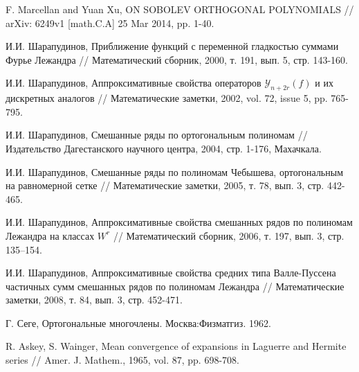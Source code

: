 \begin{thebibliography}{1}
 F. Marcellan and Yuan Xu, ON SOBOLEV ORTHOGONAL POLYNOMIALS //  arXiv: 6249v1 [math.C.A] 25 Mar 2014, pp. 1-40.

 И.И. Шарапудинов, Приближение функций с переменной гладкостью суммами Фурье Лежандра // Математический сборник, 2000, т. 191, вып. 5, стр. 143-160.

 И.И. Шарапудинов, Аппроксимативные свойства операторов $\mathcal{Y}_{n+2r}(f)$ и их дискретных аналогов // Математические заметки, 2002, vol. 72, issue 5, pp. 765-795.

 И.И. Шарапудинов, Смешанные ряды по ортогональным полиномам // Издательство Дагестанского научного центра, 2004, стр. 1-176, Махачкала.




 И.И. Шарапудинов, Смешанные ряды по полиномам Чебышева, ортогональным на равномерной сетке // Математические заметки, 2005, т. 78, вып. 3, стр. 442-465.

 И.И. Шарапудинов, Аппроксимативные свойства смешанных рядов по полиномам Лежандра на классах $W^r$ // Математический сборник, 2006, т. 197, вып. 3, стр. 135–154.


 И.И. Шарапудинов, Аппроксимативные свойства средних типа Валле-Пуссена частичных сумм смешанных рядов по полиномам Лежандра // Математические заметки, 2008, т. 84, вып. 3, стр. 452-471.

 Г. Сеге, Ортогональные многочлены. Москва:Физматгиз. 1962.

 R. Askey, S. Wainger, Mean convergence of expansions in Laguerre and Hermite series // Amer. J. Mathem., 1965, vol. 87, pp. 698-708.


\end{thebibliography}
